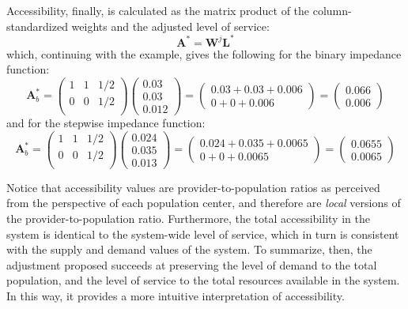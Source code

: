 \documentclass[10pt,letterpaper]{article}
\begin{document}
Accessibility, finally, is calculated as the matrix product of the
column-standardized weights and the adjusted level of service: \[
\mathbf{A}^*=\mathbf{W}^{j}\mathbf{L}^*
\] which, continuing with the example, gives the following for the
binary impedance function: \[
\mathbf{A}^*_b = 
\left(\begin{array}{ccc}
            1 & 1 & 1/2\\
            0 & 0 & 1/2\\
        \end{array}
        \right)
\left( \begin{array}{c}
0.03\\
0.03\\
0.012
\end{array} \right) =
\left( \begin{array}{c}
0.03 + 0.03 + 0.006\\
0 + 0 + 0.006
\end{array} \right)=
\left( \begin{array}{c}
0.066\\
0.006
\end{array} \right)
\] and for the stepwise impedance function: \[
\mathbf{A}^*_b = 
\left(\begin{array}{ccc}
            1 & 1 & 1/2\\
            0 & 0 & 1/2\\
        \end{array}
        \right)
\left( \begin{array}{c}
0.024\\
0.035\\
0.013
\end{array} \right) =
\left( \begin{array}{c}
0.024 + 0.035 + 0.0065\\
0 + 0 + 0.0065
\end{array} \right)=
\left( \begin{array}{c}
0.0655\\
0.0065
\end{array} \right)
\]

Notice that accessibility values are provider-to-population ratios as
perceived from the perspective of each population center, and therefore
are \emph{local} versions of the provider-to-population ratio.
Furthermore, the total accessibility in the system is identical to the
system-wide level of service, which in turn is consistent with the
supply and demand values of the system. To summarize, then, the
adjustment proposed succeeds at preserving the level of demand to the
total population, and the level of service to the total resources
available in the system. In this way, it provides a more intuitive
interpretation of accessibility.
\end{document}
